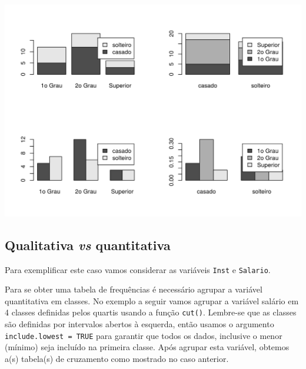 \documentclass[10pt,a4paper]{book}
\begin{document}
\begin{center}\includegraphics{figures/unnamed-chunk-316-1} \end{center}

\subsection{\texorpdfstring{Qualitativa \emph{vs}
quantitativa}{Qualitativa vs quantitativa}}\label{qualitativa-vs-quantitativa}

Para exemplificar este caso vamos considerar as variáveis \texttt{Inst}
e \texttt{Salario}.

Para se obter uma tabela de frequências é necessário agrupar a variável
quantitativa em classes. No exemplo a seguir vamos agrupar a variável
salário em 4 classes definidas pelos quartis usando a função
\texttt{cut()}. Lembre-se que as classes são definidas por intervalos
abertos à esquerda, então usamos o argumento
\texttt{include.lowest\ =\ TRUE} para garantir que todos os dados,
inclusive o menor (mínimo) seja incluído na primeira classe. Após
agrupar esta variável, obtemos a(s) tabela(s) de cruzamento como
mostrado no caso anterior.
\end{document}
